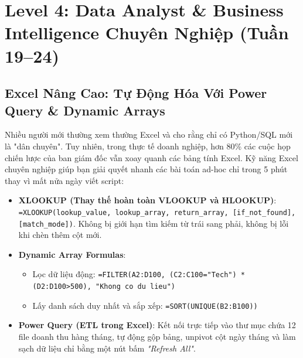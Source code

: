 \chapter{Level 4: Data Analyst \& Business Intelligence Chuyên Nghiệp (Tuần 19--24)}

\section{Excel Nâng Cao: Tự Động Hóa Với Power Query \& Dynamic Arrays}

Nhiều người mới thường xem thường Excel và cho rằng chỉ có Python/SQL mới là "dân chuyên". Tuy nhiên, trong thực tế doanh nghiệp, hơn 80\% các cuộc họp chiến lược của ban giám đốc vẫn xoay quanh các bảng tính Excel. Kỹ năng Excel chuyên nghiệp giúp bạn giải quyết nhanh các bài toán ad-hoc chỉ trong 5 phút thay vì mất nửa ngày viết script:

\begin{thuchanhbox}
\begin{itemize}
    \item \textbf{XLOOKUP (Thay thế hoàn toàn VLOOKUP và HLOOKUP)}:
    \texttt{=XLOOKUP(lookup\_value, lookup\_array, return\_array, [if\_not\_found], [match\_mode])}. Không bị giới hạn tìm kiếm từ trái sang phải, không bị lỗi khi chèn thêm cột mới.
    \item \textbf{Dynamic Array Formulas}:
    \begin{itemize}
        \item Lọc dữ liệu động: \texttt{=FILTER(A2:D100, (C2:C100="Tech") * (D2:D100>500), "Khong co du lieu")}
        \item Lấy danh sách duy nhất và sắp xếp: \texttt{=SORT(UNIQUE(B2:B100))}
    \end{itemize}
    \item \textbf{Power Query (ETL trong Excel)}: Kết nối trực tiếp vào thư mục chứa 12 file doanh thu hàng tháng, tự động gộp bảng, unpivot cột ngày tháng và làm sạch dữ liệu chỉ bằng một nút bấm \textit{"Refresh All"}.
\end{itemize}
\end{thuchanhbox}

